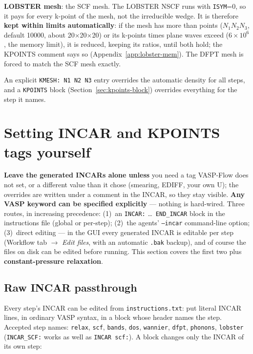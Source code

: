 \documentclass[11pt,a4paper]{scrartcl}
\newcommand{\cmd}[1]{\texttt{\detokenize{#1}}}
\begin{document}
\textbf{LOBSTER mesh}: the SCF mesh.  The LOBSTER NSCF runs with \texttt{ISYM}=0,
so it pays for every k-point of the mesh, not the irreducible wedge.  It is
therefore \textbf{kept within limits automatically}: if the mesh has more than
\cmd{LOBSTER_MAX_KPTS} points ($N_1N_2N_3$, default 10000, about 20$\times$20$\times$20)
or its k-points times plane waves exceed \cmd{LOBSTER_MAX_KPW} ($6\times10^6$, the
memory limit), it is reduced, keeping its ratios, until both hold; the KPOINTS
comment says so (Appendix~\ref{app:lobster-mem}).  The DFPT mesh is forced
to match the SCF mesh exactly.

An explicit \texttt{KMESH: N1 N2 N3} entry overrides the automatic density
for all steps, and a \texttt{KPOINTS} block (Section~\ref{sec:kpoints-block})
overrides everything for the step it names.

\section{Setting INCAR and KPOINTS tags yourself}
\label{sec:incar}

\textbf{Leave the generated INCARs alone unless} you need a tag VASP-Flow does not set,
or a different value than it chose (smearing, EDIFF, your own U); the overrides are written
under a comment in the INCAR, so they stay visible.
\textbf{Any VASP keyword can be specified explicitly} --- nothing is
hard-wired.  Three routes, in increasing precedence:
(1)~an \texttt{INCAR:} \ldots\ \texttt{END\_INCAR} block in the
instructions file (global or per-step);
(2)~the agents' \texttt{--incar} command-line option;
(3)~direct editing --- in the GUI every generated INCAR is editable per
step (Workflow tab $\to$ \emph{Edit files}, with an automatic
\texttt{.bak} backup), and of course the files on disk can be edited
before running.  This section covers the first two plus
\textbf{constant-pressure relaxation}.

\subsection{Raw INCAR passthrough}
\label{sec:incar-raw}

Every step's INCAR can be edited from \texttt{instructions.txt}: put literal INCAR
lines, in ordinary VASP syntax, in a block whose header names the step.  Accepted step
names: \texttt{relax}, \texttt{scf}, \texttt{bands}, \texttt{dos}, \texttt{wannier},
\texttt{dfpt}, \texttt{phonons}, \texttt{lobster} (\texttt{INCAR\_SCF:} works as well as
\texttt{INCAR scf:}).  A block changes only the INCAR of its own step:
\end{document}
